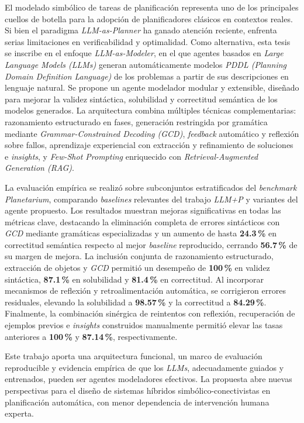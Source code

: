 \begin{resumen}
El modelado simbólico de tareas de planificación representa uno de los principales cuellos de botella para la adopción de planificadores clásicos en contextos reales. Si bien el paradigma \textit{LLM-as-Planner} ha ganado atención reciente, enfrenta serias limitaciones en verificabilidad y optimalidad. Como alternativa, esta tesis se inscribe en el enfoque \textit{LLM-as-Modeler}, en el que agentes basados en \textit{Large Language Models (LLMs)} generan automáticamente modelos \textit{PDDL (Planning Domain Definition Language)} de los problemas a partir de sus descripciones en lenguaje natural. Se propone un agente modelador modular y extensible, diseñado para mejorar la validez sintáctica, solubilidad y correctitud semántica de los modelos generados. La arquitectura combina múltiples técnicas complementarias: razonamiento estructurado en fases, generación restringida por gramática mediante \textit{Grammar-Constrained Decoding (GCD)}, \textit{feedback} automático y reflexión sobre fallos, aprendizaje experiencial con extracción y refinamiento de soluciones e \textit{insights}, y \textit{Few-Shot Prompting} enriquecido con \textit{Retrieval-Augmented Generation (RAG)}. 

La evaluación empírica se realizó sobre subconjuntos estratificados del \textit{benchmark} \textit{Planetarium}, comparando \textit{baselines} relevantes del trabajo \textit{LLM+P} y variantes del agente propuesto. Los resultados muestran mejoras significativas en todas las métricas clave, destacando la eliminación completa de errores sintácticos con \textit{GCD} mediante gramáticas especializadas y un aumento de hasta \textbf{24.3\,\%} en correctitud semántica respecto al mejor \textit{baseline} reproducido, cerrando \textbf{56.7\,\%} de su margen de mejora. La inclusión conjunta de razonamiento estructurado, extracción de objetos y \textit{GCD} permitió un desempeño de \textbf{100\,\%} en validez sintáctica, \textbf{87.1\,\%} en solubilidad y \textbf{81.4\,\%} en correctitud. Al incorporar mecanismos de reflexión y retroalimentación automática, se corrigieron errores residuales, elevando la solubilidad a \textbf{98.57\,\%} y la correctitud a \textbf{84.29\,\%}. Finalmente, la combinación sinérgica de reintentos con reflexión, recuperación de ejemplos previos e \textit{insights} construidos manualmente permitió elevar las tasas anteriores a \textbf{100\,\%} y \textbf{87.14\,\%}, respectivamente.

Este trabajo aporta una arquitectura funcional, un marco de evaluación reproducible y evidencia empírica de que los \textit{LLMs}, adecuadamente guiados y entrenados, pueden ser agentes modeladores efectivos. La propuesta abre nuevas perspectivas para el diseño de sistemas híbridos simbólico-conectivistas en planificación automática, con menor dependencia de intervención humana experta.
\end{resumen}

